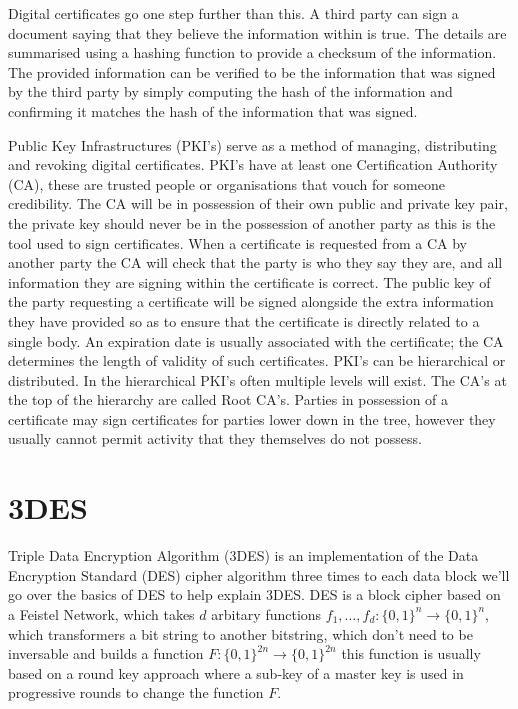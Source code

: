 \documentclass[12pt]{article}
\begin{document}
Digital certificates go one step further than this. A third party can sign a document saying that they believe the information within is true. The details are summarised using a hashing function to provide a checksum of the information. The provided information can be verified to be the information that was signed by the third party by simply computing the hash of the information and confirming it matches the hash of the information that was signed.

Public Key Infrastructures (PKI's) serve as a method of managing, distributing and revoking digital certificates. PKI's have at least one Certification Authority (CA), these are trusted people or organisations that vouch for someone credibility. The CA will be in possession of their own public and private key pair, the private key should never be in the possession of another party as this is the tool used to sign certificates. When a certificate is requested from a CA by another party the CA will check that the party is who they say they are, and all information they are signing within the certificate is correct. The public key of the party requesting a certificate will be signed alongside the extra information they have provided so as to ensure that the certificate is directly related to a single body. An expiration date is usually associated with the certificate; the CA determines the length of validity of such certificates. PKI's can be hierarchical or distributed. In the hierarchical PKI's often multiple levels will exist. The CA's at the top of the hierarchy are called Root CA's. Parties in possession of a certificate may sign certificates for parties lower down in the tree, however they usually cannot permit activity that they themselves do not possess.

\section{3DES}
\label{sec:3DES}
Triple Data Encryption Algorithm (3DES) is an implementation of the Data Encryption Standard (DES) cipher algorithm three times to each data block we'll go over the basics of DES to help explain 3DES. DES is a block cipher based on a Feistel Network, which takes $d$ arbitary functions $f_1, \ldots , f_d: \{0,1\}^n \rightarrow \{0,1\}^n$, which transformers a bit string to another bitstring, which don't need to be inversable and builds a function $F:\{0,1\}^{2n} \rightarrow \{0,1\}^{2n}$ this function is usually based on a round key approach where a sub-key of a master key is used in progressive rounds to change the function $F$.
\end{document}
